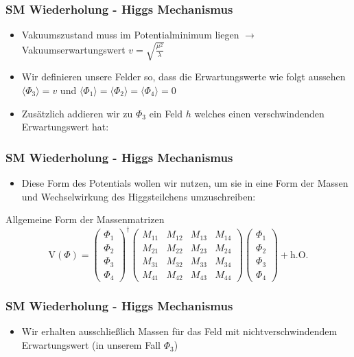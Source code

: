 \documentclass[xcolor=dvipsnames]{beamer}
\begin{document}
\begin{frame}[t]
\frametitle{SM Wiederholung - Higgs Mechanismus }
\begin{itemize}
\item Vakuumszustand muss im  Potentialminimum liegen $\rightarrow$ Vakuumserwartungswert $v=\sqrt{\frac{\mu^2}{\lambda}}$
 \item Wir definieren unsere Felder so, dass die Erwartungswerte wie folgt aussehen $\langle \Phi_{3}\rangle=v$ und  $\langle \Phi_{1}\rangle=\langle \Phi_{2}\rangle=\langle \Phi_{4}\rangle=0$ 
 \item Zusätzlich addieren wir zu $\Phi_{3}$ ein Feld $h$ welches einen verschwindenden Erwartungswert hat:
 \end{itemize}
\end{frame}

\begin{frame}[t]
\frametitle{SM Wiederholung - Higgs Mechanismus }
\begin{itemize}
\item Diese Form des Potentials wollen wir nutzen, um sie in eine Form der Massen und Wechselwirkung des Higgsteilchens umzuschreiben:
\end{itemize}
\begin{block}{Allgemeine Form der Massenmatrizen}
\begin{equation*}
\text{V}(\Phi)=\left( \begin{array}{c} \Phi_{1}\\ \Phi_{2} \\ \Phi_{3} \\ \Phi_{4} \end{array}\right)^{\dagger}  \begin{pmatrix} M_{11}&M_{12}&M_{13}&M_{14}\\M_{21}&M_{22}&M_{23}&M_{24} \\ M_{31}&M_{32}&M_{33}&M_{34}\\ M_{41}&M_{42}&M_{43}&M_{44}\end{pmatrix}\left( \begin{array}{c} \Phi_{1}\\ \Phi_{2} \\ \Phi_{3} \\ \Phi_{4} \end{array}\right) + \text{h.O.}
\end{equation*}
\end{block}
\end{frame} 

\begin{frame}[t]
\frametitle{SM Wiederholung - Higgs Mechanismus }
\begin{itemize}
\item Wir erhalten ausschließlich Massen für das Feld mit nichtverschwindendem Erwartungswert (in unserem Fall $\Phi_{3}$)
\end{itemize}




\end{frame}
\end{document}
